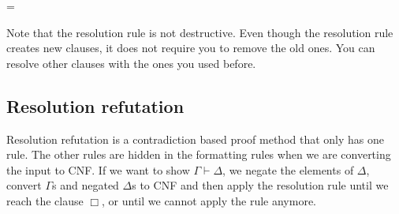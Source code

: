 \documentclass[10pt]{article}
\newenvironment{warning}
  {\par\begin{mdframed}[linewidth=1pt,linecolor=black]%
    \begin{list}{}{\leftmargin=1cm
                   \labelwidth=\leftmargin}\item[\Large\ding{43}]}
  {\end{list}\end{mdframed}\par}
\begin{document}
\begin{warning}
Note that the resolution rule is not destructive. Even though the resolution rule creates new clauses, it does not require you to remove the old ones. You can resolve other clauses with the ones you used before.
\end{warning}

\subsection{Resolution refutation}
Resolution refutation is a contradiction based proof method that only has one rule. The other rules are hidden in the formatting rules when we are converting the input to CNF. If we want to show $\Gamma \vdash \Delta$, we negate the elements of $\Delta$, convert $\Gamma$s and negated $\Delta$s to CNF and then apply the resolution rule until we reach the clause $\Box$, or until we cannot apply the rule anymore.
\end{document}

